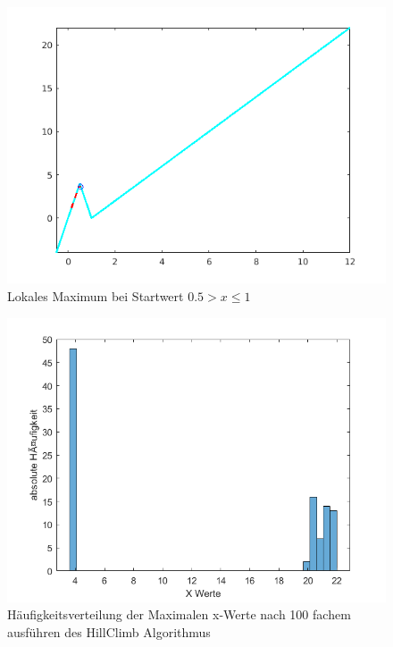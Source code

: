 \documentclass{hbrs-ecta-report}
\begin{document}
\begin{figure}[t]
	\includegraphics[width=\linewidth]{img/plot_fit_local_max_left.png}
	\caption{Lokales Maximum bei Startwert  $0.5 > x\leq1$ }
	\label{fig:fit_local_max_left} 
\end{figure}
\begin{figure}[p]
	\includegraphics[width=\linewidth]{img/histogram_of_100_HillClimbs.png}
	\caption{Häufigkeitsverteilung der Maximalen x-Werte nach 100 fachem ausführen des HillClimb Algorithmus}
	\label{fig:histogram} 
\end{figure}
\end{document}
